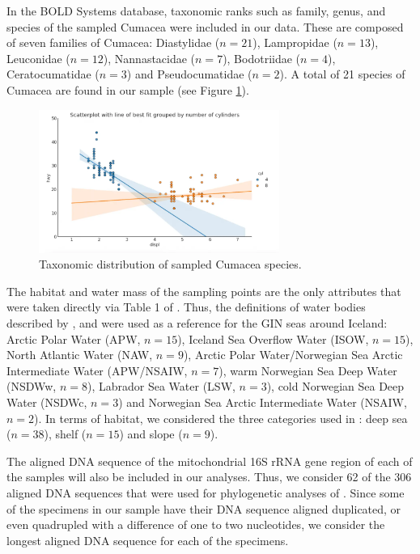 In the BOLD Systems database, taxonomic ranks such as family, genus, and species of the sampled Cumacea were included in our data. These are composed of seven families of Cumacea: Diastylidae (\( n=21 \)), Lampropidae (\( n=13 \)), Leuconidae (\( n=12 \)), Nannastacidae (\( n=7 \)), Bodotriidae (\( n=4 \)), Ceratocumatidae (\( n=3 \)) and Pseudocumatidae (\( n=2 \)). A total of 21 species of Cumacea are found in our sample (see Figure \ref{fig:fig2}).

\begin{figure}[]
    \centering
    \includegraphics[width=0.7\textwidth]{figure7.webp}
    \caption{Taxonomic distribution of sampled Cumacea species. \label{fig:fig2}}
\end{figure}

The habitat and water mass of the sampling points are the only attributes that were taken directly via Table 1 of \cite{uhlir_adding_2021}. Thus, the definitions of water bodies described by \cite{hansen_north_2000}, \cite{brix_distribution_2010} and \cite{ostmann_marine_2014} were used as a reference for the GIN seas around Iceland: Arctic Polar Water (APW, \( n=15 \)), Iceland Sea Overflow Water (ISOW, \( n=15 \)), North Atlantic Water (NAW, \( n=9 \)), Arctic Polar Water/Norwegian Sea Arctic Intermediate Water (APW/NSAIW, \( n=7 \)), warm Norwegian Sea Deep Water (NSDWw, \( n=8 \)), Labrador Sea Water (LSW, \( n=3 \)), cold Norwegian Sea Deep Water (NSDWc, \( n=3 \)) and Norwegian Sea Arctic Intermediate Water (NSAIW, \( n=2 \)). In terms of habitat, we considered the three categories used in \cite{uhlir_adding_2021}: deep sea (\( n=38 \)), shelf (\( n=15 \)) and slope (\( n=9 \)).

The aligned DNA sequence of the mitochondrial 16S rRNA gene region of each of the samples will also be included in our analyses. Thus, we consider 62 of the 306 aligned DNA sequences that were used for phylogenetic analyses of \cite{uhlir_adding_2021}. Since some of the specimens in our sample have their DNA sequence aligned duplicated, or even quadrupled with a difference of one to two nucleotides, we consider the longest aligned DNA sequence for each of the specimens.


